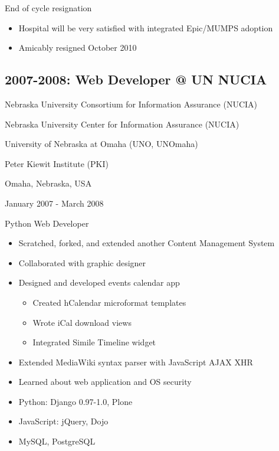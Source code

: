 \documentclass[letter,,openany,oneside,english]{sphinxhowto}
\begin{document}
End of cycle resignation
\begin{itemize}
\item {} 
Hospital will be very satisfied with integrated Epic/MUMPS adoption

\item {} 
Amicably resigned October 2010

\end{itemize}


\subsection{2007-2008: Web Developer @ UN NUCIA}
\label{\detokenize{resume:web-developer-un-nucia}}
\begin{DUlineblock}{0em}
\item[] Nebraska University Consortium for Information Assurance (NUCIA)
\item[] Nebraska University Center for Information Assurance (NUCIA)
\item[] University of Nebraska at Omaha (UNO, UNOmaha)
\item[] Peter Kiewit Institute (PKI)
\item[] Omaha, Nebraska, USA
\item[] January 2007 - March 2008
\end{DUlineblock}

Python Web Developer
\begin{itemize}
\item {} 
Scratched, forked, and extended another Content Management System

\item {} 
Collaborated with graphic designer

\item {} 
Designed and developed events calendar app
\begin{itemize}
\item {} 
Created hCalendar microformat templates

\item {} 
Wrote iCal download views

\item {} 
Integrated Simile Timeline widget

\end{itemize}

\item {} 
Extended MediaWiki syntax parser with JavaScript AJAX XHR

\item {} 
Learned about web application and OS security

\item {} 
Python: Django 0.97-1.0, Plone

\item {} 
JavaScript: jQuery, Dojo

\item {} 
MySQL, PostgreSQL

\end{itemize}
\end{document}
